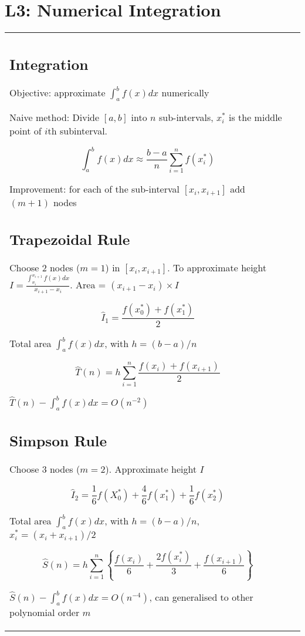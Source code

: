 \section{L3: Numerical Integration}

\begin{tabulary}{\textwidth}{l L}

\subsection{Integration}

Objective: approximate $\int_a^b f(x) dx$ numerically

Naive method: Divide $[a, b]$ into $n$ sub-intervals,  $x^*_i$ is the middle point of $i$th subinterval.

$$\int_a^b f(x) dx \approx \frac{b-a}{n}\sum_{i=1}^n f(x_i^*)$$

Improvement: for each of the sub-interval $[x_i, x_{i+1}]$ add $(m+1)$ nodes

\subsection{Trapezoidal Rule}

Choose 2 nodes ($m=1$) in $[x_i, x_{i+1}]$.
To approximate height $I = \frac{\int_{x_i}^{x_{i+1}} f(x) dx }{x_{i+1} -x_i}$. Area = $(x_{i+1} - x_{i})\times I$

$$
\hat I_1 = \frac{f(x^*_0) + f(x^*_1)}{2}
$$

Total area $\int_a^b f(x) dx$, with $h = (b-a)/n$

$$
\hat T(n) = h \sum_{i=1}^n \frac{f(x_i) + f(x_{i+1})}{2}
$$

$\hat T(n) - \int_a^b f(x)dx = O(n^{-2})$

\subsection{Simpson Rule}

Choose 3 nodes ($m=2$). Approximate height $I$

$$
\hat I_2 = \frac{1}{6} f(X^*_0) + \frac{4}{6} f(x_1^*) + \frac{1}{6} f(x^*_2)
$$

Total area $\int_a^b f(x) dx$, with $h = (b-a)/n$, $x^*_i = (x_i+x_{i+1})/2$

$$
\hat S(n) = h\sum_{i=1}^n \left\{
\frac{f(x_i)}{6} + \frac{2f(x_i^*)}{3} + \frac{f(x_{i+1})}{6}
\right\}
$$

$\hat S(n) - \int_a^b f(x) dx = O(n^{-4})$, can generalised to other polynomial order $m$


\end{tabulary}
